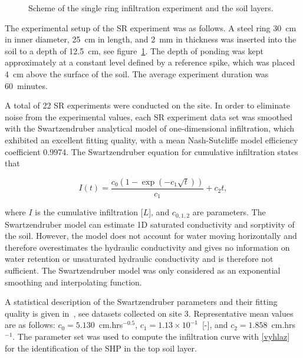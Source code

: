 \documentclass[review,times,3p,10pt]{elsarticle}
\newenvironment{lineq}
    {\begin{linenomath*}
    \begin{equation}
    }
    { 
    \end{equation} 
    \end{linenomath*}
    }
\begin{document}
 


 \begin{figure}
\centering
{}
 \caption{Scheme of the single ring infiltration experiment and the soil layers. }
 \label{experiment}
\end{figure}



The experimental setup of the SR experiment was as follows. A steel ring 30~cm in inner diameter, 25~cm in length, and 2~mm in thickness was inserted into the soil to a depth of 12.5~cm, see figure~\ref{experiment}. The depth of ponding was kept approximately at a constant level defined by a reference spike, which was placed 4~cm above the surface of the soil. The average experiment duration was 60~minutes.


A total of 22 SR experiments were conducted on the site. In order to eliminate noise from the experimental values, each SR experiment data set was smoothed with the Swartzendruber analytical model \citep{Swartzendruber}
of one-dimensional infiltration, which exhibited an excellent fitting quality, with a mean Nash-Sutcliffe model efficiency coefficient  0.9974. The Swartzendruber equation for cumulative infiltration states that
\begin{lineq}
I(t)=\frac{c_0\left(1-\exp\left(-c_1\sqrt{t}\right)\right)}{c_1}+c_2t,
\label{vyhlaz}
\end{lineq}
where $I$ is the cumulative infiltration [$L$], and $c_{0,1,2}$ are parameters. The Swartzendruber model can estimate 1D saturated conductivity and sorptivity of the soil. However, the model does not account for water moving horizontally and therefore overestimates the hydraulic conductivity and gives no information on water retention or unsaturated hydraulic conductivity and is therefore not sufficient. The Swartzendruber model was only considered as an exponential smoothing and interpolating function.


 
A statistical description of the Swartzendruber parameters and their fitting quality is given in~\citep{jacka-site}, see datasets collected on site 3. Representative mean values are as follows: $c_0 =5.130$~cm.hrs$^{-0.5}$, $c_1 = 1.13 \times 10^{-1}$~[-], and $c_2 = 1.858$~cm.hrs$^{-1}$. The parameter set was used to compute the infiltration curve with \eqref{vyhlaz} for the identification of the SHP in the top soil layer.
\end{document}
